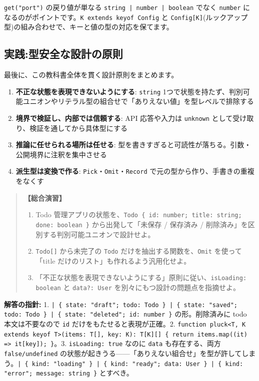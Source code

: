 \documentclass{article}
\begin{document}
\texttt{get("port")} の戻り値が単なる \texttt{string | number | boolean} でなく \texttt{number} になるのがポイントです。\texttt{K extends keyof Config} と \texttt{Config[K]}(ルックアップ型)の組み合わせで、キーと値の型の対応を保てます。

\subsection{実践:型安全な設計の原則}

最後に、この教科書全体を貫く設計原則をまとめます。

\begin{enumerate}
\item \textbf{不正な状態を表現できないようにする}: \texttt{string} 1つで状態を持たず、判別可能ユニオンやリテラル型の組合せで「ありえない値」を型レベルで排除する
\item \textbf{境界で検証し、内部では信頼する}: API 応答や入力は \texttt{unknown} として受け取り、検証を通してから具体型にする
\item \textbf{推論に任せられる場所は任せる}: 型を書きすぎると可読性が落ちる。引数・公開境界に注釈を集中させる
\item \textbf{派生型は変換で作る}: \texttt{Pick}・\texttt{Omit}・\texttt{Record} で元の型から作り、手書きの重複をなくす
\end{enumerate}

\begin{quote}
\textbf{【総合演習】}
\begin{enumerate}
\item Todo 管理アプリの状態を、\texttt{Todo \{ id: number; title: string; done: boolean \}} から出発して「未保存 / 保存済み / 削除済み」を区別する判別可能ユニオンで設計せよ。
\item \texttt{Todo[]} から未完了の \texttt{Todo} だけを抽出する関数を、\texttt{Omit} を使って「title だけのリスト」も作れるよう汎用化せよ。
\item 「不正な状態を表現できないようにする」原則に従い、\texttt{isLoading: boolean} と \texttt{data?: User} を別々にもつ設計の問題点を指摘せよ。
\end{enumerate}
\end{quote}

\textbf{解答の指針:} 1. \texttt{| \{ state: "draft"; todo: Todo \} | \{ state: "saved"; todo: Todo \} | \{ state: "deleted"; id: number \}} の形。削除済みに todo 本文は不要なので \texttt{id} だけをもたせると表現が正確。2. \texttt{function pluck<T, K extends keyof T>(items: T[], key: K): T[K][] \{ return items.map((it) => it[key]); \}}。3. \texttt{isLoading: true} なのに \texttt{data} も存在する、両方 \texttt{false/undefined} の状態が起きうる——「ありえない組合せ」を型が許してしまう。\texttt{| \{ kind: "loading" \} | \{ kind: "ready"; data: User \} | \{ kind: "error"; message: string \}} とすべき。
\end{document}
